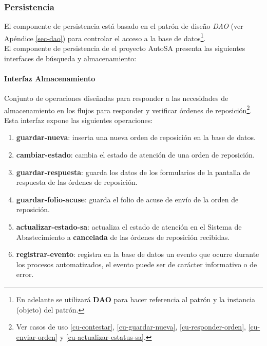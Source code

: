\subsubsection{Persistencia}
El componente de persistencia está basado en el patrón de diseño \textit{DAO} (ver Apéndice \ref{sec-dao}) para controlar el acceso a la base de datos\footnote{En adelante se utilizará \textbf{DAO} para hacer referencia al patrón y la instancia (objeto) del patrón.}.\\
El componente de persistencia de el proyecto AutoSA presenta las siguientes interfaces de búsqueda y almacenamiento:
\paragraph{\indent Interfaz Almacenamiento\\}
Conjunto de operaciones diseñadas para responder a las necesidades de almacenamiento en los flujos para responder y verificar órdenes de reposición\footnote{Ver casos de uso \ref{cu-contestar}, \ref{cu-guardar-nueva}, \ref{cu-responder-orden}, \ref{cu-enviar-orden} y \ref{cu-actualizar-estatus-sa}.}. Esta interfaz expone las siguientes operaciones:
\begin{enumerate}
	\item \textbf{guardar-nueva}: inserta una nueva orden de reposición en la base de datos.
	\item \textbf{cambiar-estado}: cambia el estado de atención de una orden de reposición.
	\item \textbf{guardar-respuesta}: guarda los datos de los formularios de la pantalla de respuesta de las órdenes de reposición.
	\item \textbf{guardar-folio-acuse}: guarda el folio de acuse de envío de la orden de reposición.
	\item \textbf{actualizar-estado-sa}: actualiza el estado de atención en el Sistema de Abastecimiento a \textbf{cancelada} de las órdenes de reposición recibidas.
	\item \textbf{registrar-evento}: registra en la base de datos un evento que ocurre durante los procesos automatizados, el evento puede ser de carácter informativo o de error.
\end{enumerate}

